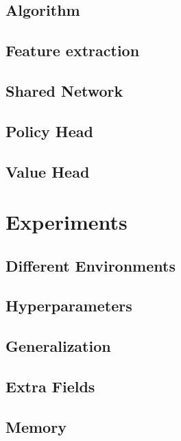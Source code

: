 \subsection{Algorithm}



\subsection{Feature extraction}

\subsection{Shared Network}

\subsection{Policy Head}

\subsection{Value Head}

\section{Experiments}

\subsection{Different Environments}

\subsection{Hyperparameters}

\subsection{Generalization}

\subsection{Extra Fields}

\subsection{Memory}

